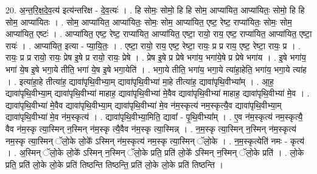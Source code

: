 \documentclass[17pt]{extarticle}
\begin{document}
20. अ॒न्त॒रि॒क्ष॒दे॒व॒त्य॑ इत्य॑न्तरिक्ष - दे॒व॒त्यः॑ । . हि सोमः॒ सोमो॒ हि हि सोम॒ आप्या॑यित॒ आप्या॑यितः॒ सोमो॒ हि हि सोम॒ आप्या॑यितः । . सोम॒ आप्या॑यित॒ आप्या॑यितः॒ सोमः॒ सोम॒ आप्या॑यित॒ एष्ट॒ रेष्ट॒ राप्या॑यितः॒ सोमः॒ सोम॒ आप्या॑यित॒ एष्टः॑ । . आप्या॑यित॒ एष्ट॒ रेष्ट॒ राप्या॑यित॒ आप्या॑यित॒ एष्टा॒ रायो॒ राय॒ एष्ट॒ राप्या॑यित॒ आप्या॑यित॒ एष्टा॒ रायः॑ । . आप्या॑यित॒ इत्या - प्या॒यि॒तः॒ । . एष्टा॒ रायो॒ राय॒ एष्ट॒ रेष्टा॒ रायः॒ प्र प्र राय॒ एष्ट॒ रेष्टा॒ रायः॒ प्र । . रायः॒ प्र प्र रायो॒ रायः॒ प्रेष इ॒षे प्र रायो॒ रायः॒ प्रेषे । . प्रेष इ॒षे प्र प्रेषे भगा॑य॒ भगा॑ये॒षे प्र प्रेषे भगा॑य । . इ॒षे भगा॑य॒ भगा॑ ये॒ष इ॒षे भगा॒ये तीति॒ भगा॑ ये॒ष इ॒षे भगा॒येति॑ । . भगा॒ये तीति॒ भगा॑य॒ भगा॒ये त्या॑हा॒हेति॒ भगा॑य॒ भगा॒ये त्या॑ह । . इत्या॑हा॒हे तीत्या॑ह॒ द्यावा॑पृथि॒वीभ्या॒म् द्यावा॑पृथि॒वीभ्या॑ मा॒हे तीत्या॑ह॒ द्यावा॑पृथि॒वीभ्या᳚म् । . आ॒ह॒ द्यावा॑पृथि॒वीभ्या॒म् द्यावा॑पृथि॒वीभ्या॑ माहाह॒ द्यावा॑पृथि॒वीभ्या॑ मे॒वैव द्यावा॑पृथि॒वीभ्या॑ माहाह॒ द्यावा॑पृथि॒वीभ्या॑ मे॒व । . द्यावा॑पृथि॒वीभ्या॑ मे॒वैव द्यावा॑पृथि॒वीभ्या॒म् द्यावा॑पृथि॒वीभ्या॑ मे॒व न॑म॒स्कृत्य॑ नम॒स्कृत्यै॒व द्यावा॑पृथि॒वीभ्या॒म् द्यावा॑पृथि॒वीभ्या॑ मे॒व न॑म॒स्कृत्य॑ । . द्यावा॑पृथि॒वीभ्या॒मिति॒ द्यावा᳚ - पृ॒थि॒वीभ्या᳚म् । . ए॒व न॑म॒स्कृत्य॑ नम॒स्कृत्यै॒ वैव न॑म॒स्कृ त्या॒स्मिन् न॒स्मिन् न॑म॒स्कृ त्यै॒वैव न॑म॒स्कृ त्या॒स्मिन्न् । . न॒म॒स्कृ त्या॒स्मिन् न॒स्मिन् न॑म॒स्कृत्य॑ नम॒स्कृ त्या॒स्मिन् ॅलो॒के लो॒के᳚ ऽस्मिन् न॑म॒स्कृत्य॑ नम॒स्कृ त्या॒स्मिन् ॅलो॒के । . न॒म॒स्कृत्येति॑ नमः - कृत्य॑ । . अ॒स्मिन् ॅलो॒के लो॒के᳚ ऽस्मिन् न॒स्मिन् ॅलो॒के प्रति॒ प्रति॑ लो॒के᳚ ऽस्मिन् न॒स्मिन् ॅलो॒के प्रति॑ । . लो॒के प्रति॒ प्रति॑ लो॒के लो॒के प्रति॑ तिष्ठन्ति तिष्ठन्ति॒ प्रति॑ लो॒के लो॒के प्रति॑ तिष्ठन्ति । \newline
\end{document}
